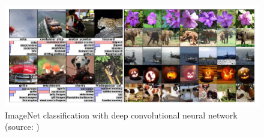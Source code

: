 \newpage

  \begin{figure}[h]
    \centering
    \includegraphics[keepaspectratio, scale=0.80] {images/pdf/deep_convolutional_neural_networks}
    \caption[ImageNet classification with deep convolutional neural network]{ImageNet classification with deep convolutional neural network (source: \cite{alex})}
    \label{Fig:deep_convolutional_neural_networks}
  \end{figure}


\newpage
